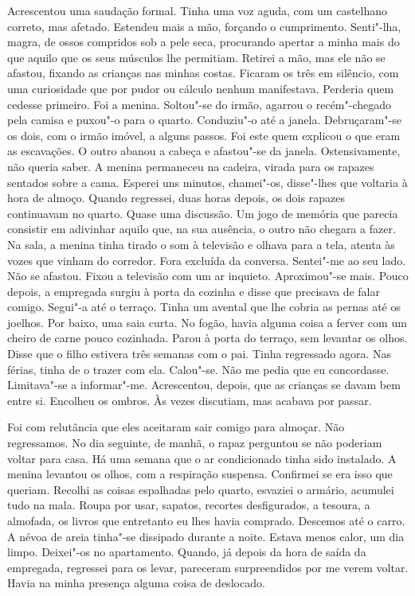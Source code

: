 Acrescentou uma saudação formal. Tinha uma voz aguda, com um castelhano
correto, mas afetado. Estendeu mais a mão, forçando o cumprimento.
Senti"-lha, magra, de ossos compridos sob a pele seca, procurando
apertar a minha mais do que aquilo que os seus músculos lhe permitiam.
Retirei a mão, mas ele não se afastou, fixando as crianças nas minhas
costas. Ficaram os três em silêncio, com uma curiosidade que por pudor
ou cálculo nenhum manifestava. Perderia quem cedesse primeiro. Foi a
menina. Soltou"-se do irmão, agarrou o recém"-chegado pela camisa e
puxou"-o para o quarto. Conduziu"-o até a janela. Debruçaram"-se os
dois, com o irmão imóvel, a alguns passos. Foi este quem explicou o que
eram as escavações. O outro abanou a cabeça e afastou"-se da janela.
Ostensivamente, não queria saber. A menina permaneceu na cadeira, virada
para os rapazes sentados sobre a cama. Esperei uns minutos, chamei"-os,
disse"-lhes que voltaria à hora de almoço. Quando regressei, duas horas
depois, os dois rapazes continuavam no quarto. Quase uma discussão. Um
jogo de memória que parecia consistir em adivinhar aquilo que, na sua
ausência, o outro não chegara a fazer. Na sala, a menina tinha tirado o
som à televisão e olhava para a tela, atenta às vozes que vinham do
corredor. Fora excluída da conversa. Sentei"-me ao seu lado. Não se
afastou. Fixou a televisão com um ar inquieto. Aproximou"-se mais.
Pouco depois, a empregada surgiu à porta da cozinha e disse que
precisava de falar comigo. Segui"-a até o terraço. Tinha um avental que
lhe cobria as pernas até os joelhos. Por baixo, uma saia curta. No
fogão, havia alguma coisa a ferver com um cheiro de carne pouco
cozinhada. Parou à porta do terraço, sem levantar os olhos. Disse que o
filho estivera três semanas com o pai. Tinha regressado agora. Nas
férias, tinha de o trazer com ela. Calou"-se. Não me pedia que eu
concordasse. Limitava"-se a informar"-me. Acrescentou, depois, que as
crianças se davam bem entre si. Encolheu os ombros. Às vezes discutiam,
mas acabava por passar.

Foi com relutância que eles aceitaram sair comigo para almoçar. Não
regressamos. No dia seguinte, de manhã, o rapaz perguntou se não
poderiam voltar para casa. Há uma semana que o ar condicionado tinha
sido instalado. A menina levantou os olhos, com a respiração suspensa.
Confirmei se era isso que queriam. Recolhi as coisas espalhadas pelo
quarto, esvaziei o armário, acumulei tudo na mala. Roupa por usar,
sapatos, recortes desfigurados, a tesoura, a almofada, os livros que
entretanto eu lhes havia comprado. Descemos até o carro. A névoa de
areia tinha"-se dissipado durante a noite. Estava menos calor, um dia
limpo. Deixei"-os no apartamento. Quando, já depois da hora de saída da
empregada, regressei para os levar, pareceram surpreendidos por me verem
voltar. Havia na minha presença alguma coisa de deslocado.

